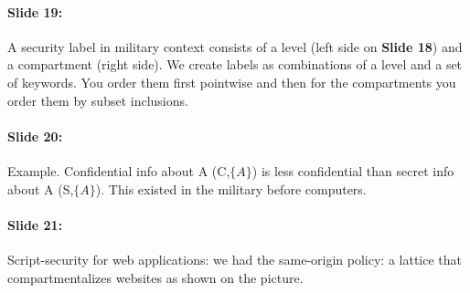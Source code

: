 \documentclass[10pt,a4paper]{report}
\begin{document}
\paragraph{Slide 19:} A security label in military context consists of a level (left side on \textbf{Slide 18}) and a compartment (right side). We create labels as combinations of a level and a set of keywords. You order them first pointwise and then for the compartments you order them by subset inclusions. 

\paragraph{Slide 20:} Example. Confidential info about A (C,$\lbrace A \rbrace$) is less confidential than secret info about A (S,$\lbrace A \rbrace$). This existed in the military before computers.

\paragraph{Slide 21:} Script-security for web applications: we had the same-origin policy: a lattice that compartmentalizes websites as shown on the picture. 
\end{document}

